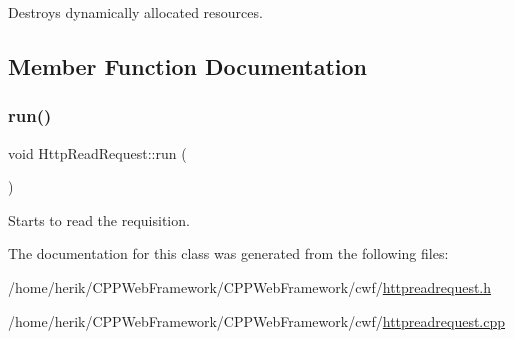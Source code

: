 Destroys dynamically allocated resources. 



\subsection{Member Function Documentation}
\mbox{\label{class_http_read_request_a8db91de80ce8e83a3b89758a22eec5c3}} 
\subsubsection{\texorpdfstring{run()}{run()}}
{\footnotesize\ttfamily void Http\+Read\+Request\+::run (\begin{DoxyParamCaption}{ }\end{DoxyParamCaption})\hspace{0.3cm}{\ttfamily [override]}}



Starts to read the requisition. 



The documentation for this class was generated from the following files\+:\begin{DoxyCompactItemize}
\item 
/home/herik/\+C\+P\+P\+Web\+Framework/\+C\+P\+P\+Web\+Framework/cwf/\hyperlink{httpreadrequest_8h}{httpreadrequest.\+h}\item 
/home/herik/\+C\+P\+P\+Web\+Framework/\+C\+P\+P\+Web\+Framework/cwf/\hyperlink{httpreadrequest_8cpp}{httpreadrequest.\+cpp}\end{DoxyCompactItemize}
